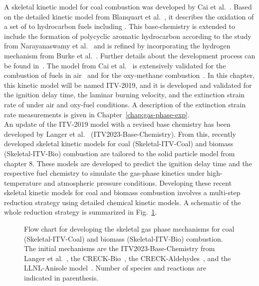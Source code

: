 \begin{refsection}
A skeletal kinetic model for coal combustion was developed by Cai et al.~\cite{Cai2019}. Based on the detailed kinetic model from Blanquart et al.~\cite{Blanquart2009}, it describes the oxidation of a set of  to  hydrocarbon fuels including . This base-chemistry is extended to include the formation of polycyclic aromatic hydrocarbon according to the study from Narayanaswamy et al.~\cite{Narayanaswamy2010} and is refined by incorporating the hydrogen mechanism from Burke et al.~\cite{Burke2012}. Further details about the development process can be found in~\cite{Cai2019,Cai2020}. The model from Cai et al.~\cite{Cai2020} is extensively validated for the combustion of fuels in air~\cite{Cai2019} and for the oxy-methane combustion~\cite{Cai2020}. In this chapter, this kinetic model will be named ITV-2019, and it is developed and validated for the ignition delay time, the laminar burning velocity, and the extinction strain rate of  under air and oxy-fuel conditions. A description of the extinction strain rate measurements is given in Chapter~\ref{chap:gas-phase-exp}.
\\
An update of the ITV-2019 model with a revised base chemistry has been developed by Langer et al.~\cite{Langer2023} (ITV2023-Base-Chemistry). From this, recently developed skeletal kinetic models for coal (Skeletal-ITV-Coal) and biomass (Skeletal-ITV-Bio) combustion are tailored to the solid particle model from chapter 8. These models are developed to predict the ignition delay time and the respective fuel chemistry to simulate the gas-phase kinetics under high-temperature and atmospheric pressure conditions. Developing these recent skeletal kinetic models for coal and biomass combustion involves a multi-step reduction strategy using detailed chemical kinetic models. A schematic of the whole reduction strategy is summarized in Fig.~\ref{fig:B1bKineticModelDevelopmentStructure}.
\begin{figure}[h]
  \centering
  \caption{Flow chart for developing the skeletal gas phase mechanisms for coal (Skeletal-ITV-Coal) and biomass (Skeletal-ITV-Bio) combustion. The initial mechanisms are the ITV2023-Base-Chemistry from Langer et al.~\cite{Langer2023}, the CRECK-Bio~\cite{Debiagi2016}, the CRECK-Aldehydes~\cite{Pelucchi2015}, and the LLNL-Anisole model~\cite{Wagnon2018}. Number of species and reactions are indicated in parenthesis.}
  \label{fig:B1bKineticModelDevelopmentStructure}

\end{figure}
\end{refsection}
